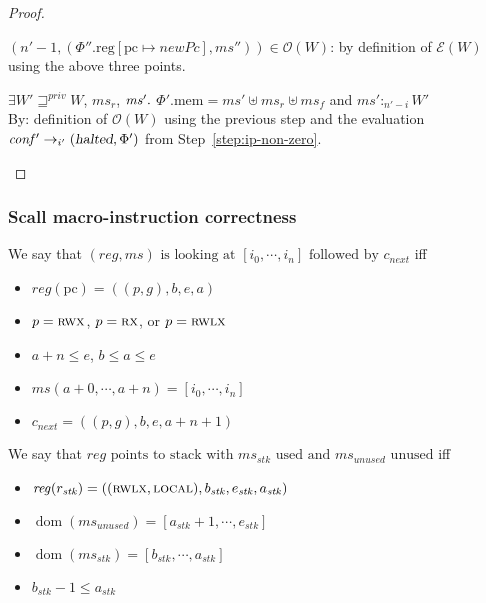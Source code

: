 \documentclass[a4paper]{article}
\newcommand{\update}[2]{[#1 \mapsto #2]}
\DeclareMathOperator{\dom}{dom}
\newcommand\lau[1]{{\color{purple} \sf \footnotesize {LS: #1}}\\}
\renewcommand\lau[1]{}
\newcommand{\var}[1]{\mathit{#1}}
\newcommand{\hs}{\var{ms}}
\newcommand{\ms}{\hs}
\newcommand{\pcreg}{\mathrm{pc}}
\newcommand{\reg}{\var{reg}}
\newcommand{\heap}{\var{mem}}
\newcommand{\stk}{\var{stk}}
\newcommand{\plainproj}[1]{\mathrm{#1}}
\newcommand{\memheap}[1][\Phi]{#1.\plainproj{mem}}
\newcommand{\memreg}[1][\Phi]{#1.\plainproj{reg}}
\newcommand{\halted}{\textsl{halted}}
\newcommand{\futurestr}{\mathbin{\sqsupseteq}^{\var{priv}}}
\newcommand{\heapSat}[3][\heap]{#1 :_{#2} #3}
\newcommand{\asmType}{\plaindom{AsmType}}
\newcommand{\plaindom}[1]{\mathrm{#1}}
\newcommand{\intr}[2]{\mathcal{#1}}
\newcommand{\exprintr}[1]{\intr{E}{#1}}
\newcommand{\stder}{\exprintr{\asmType}}
\newcommand{\observations}{\mathcal{O}}
\newcommand{\npair}[2][n]{\left(#1,#2 \right)}
\newcommand{\plainperm}[1]{\textsc{#1}}
\newcommand{\exec}{\plainperm{rx}}
\newcommand{\rwx}{\plainperm{rwx}}
\newcommand{\rwlx}{\plainperm{rwlx}}
\newcommand{\local}{\plainperm{local}}
\newcommand{\step}[1][]{\rightarrow_{#1}}
\begin{document}
\begin{proof}
\begin{enumproof}
\begin{enumproof}
      $\npair[n'-1]{(\memreg[\Phi'']\update{\pcreg}{\var{newPc}},\ms'')}\in\observations(W)$:
      by definition of $\stder(W)$ using the above three points.
    \item $\exists W' \futurestr W$, $\hs_r$, $\hs' \ldotp$
      $\memheap[\Phi'] = \hs' \uplus \hs_r \uplus \ms_f$ and $\heapSat[\hs']{n'-i}{W'}$\\
      By: definition of $\observations(W)$ using the previous step and the
      evaluation $\var{conf'}\step[i'] (\halted,\Phi')$ from
      Step~\ref{step:ip-non-zero}.
    \end{enumproof}
  \end{enumproof}
\end{proof}

\subsubsection{Scall macro-instruction correctness}
\begin{definition}
  We say that $(\reg,\ms) \text{ is looking at } [i_0,\cdots,i_n] \text{ followed by } c_{\mathit{next}}$ 
  iff
  \begin{itemize}
  \item $\reg(\pcreg) = ((p,g),b,e,a)$
  \item $p = \rwx$, $p = \exec$, or $p = \rwlx$
  \item $a+n\leq e$, $b\leq a\leq e$
  \item $\ms(a+0,\cdots,a+n) = [i_0,\cdots,i_n]$
  \item $c_{\mathit{next}} = ((p,g),b,e,a+n+1)$
  \end{itemize}
\end{definition}

\begin{definition}
  We say that $\reg \text{ points to stack with $\ms_\stk$ used and $\ms_{\mathit{unused}}$ unused}$
  iff
  \begin{itemize}
  \item $\reg(r_\stk) =((\rwlx,\local),b_\stk,e_\stk,a_\stk)$
  \item $\dom(\ms_{\mathit{unused}}) = [a_\stk+1,\cdots,e_\stk]$
  \item $\dom(\ms_\stk) = [b_\stk,\cdots,a_\stk]$ \lau{Maybe make it clear what happens when $\ms_\stk$ is empty}
  \item $b_\stk - 1\leq a_\stk$
  \end{itemize}
\end{definition}
\end{document}
